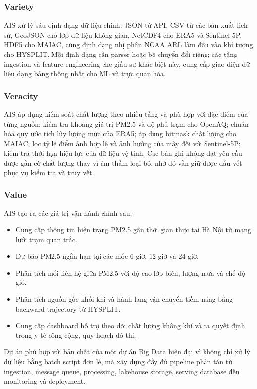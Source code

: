 \documentclass[12pt,a4paper]{article}
\newcommand{\tightlist}{\setlength{\itemsep}{0pt}\setlength{\parskip}{0pt}}
\begin{document}
\subsubsection{Variety}

AIS xử lý sáu định dạng dữ liệu chính: JSON từ API, CSV từ các bản xuất lịch sử, GeoJSON cho lớp dữ liệu không gian, NetCDF4 cho ERA5 và Sentinel-5P, HDF5 cho MAIAC, cùng định dạng nhị phân NOAA ARL làm đầu vào khí tượng cho HYSPLIT. Mỗi định dạng cần parser hoặc bộ chuyển đổi riêng; các tầng ingestion và feature engineering che giấu sự khác biệt này, cung cấp giao diện dữ liệu dạng bảng thống nhất cho ML và trực quan hóa.

\subsubsection{Veracity}

AIS áp dụng kiểm soát chất lượng theo nhiều tầng và phù hợp với đặc điểm của từng nguồn: kiểm tra khoảng giá trị PM2.5 và độ phủ trạm cho OpenAQ; chuẩn hóa quy ước tích lũy lượng mưa của ERA5; áp dụng bitmask chất lượng cho MAIAC; lọc tỷ lệ điểm ảnh hợp lệ và ảnh hưởng của mây đối với Sentinel-5P; kiểm tra thời hạn hiệu lực của dữ liệu vệ tinh. Các bản ghi không đạt yêu cầu được gắn cờ chất lượng thay vì âm thầm loại bỏ, nhờ đó vẫn giữ được dấu vết phục vụ kiểm tra và truy vết.

\subsubsection{Value}

AIS tạo ra các giá trị vận hành chính sau:

\begin{itemize}
\tightlist
\item
  Cung cấp thông tin hiện trạng PM2.5 gần thời gian thực tại Hà Nội từ mạng lưới trạm quan trắc.
\item
  Dự báo PM2.5 ngắn hạn tại các mốc 6 giờ, 12 giờ và 24 giờ.
\item
  Phân tích mối liên hệ giữa PM2.5 với độ cao lớp biên, lượng mưa và chế độ gió.
\item
  Phân tích nguồn gốc khối khí và hành lang vận chuyển tiềm năng bằng backward trajectory từ HYSPLIT.
\item
  Cung cấp dashboard hỗ trợ theo dõi chất lượng không khí và ra quyết định trong y tế công cộng, quy hoạch đô thị.
\end{itemize}

Dự án phù hợp với bản chất của một dự án Big Data hiện đại vì không chỉ xử lý dữ liệu bằng batch script đơn lẻ, mà xây dựng đầy đủ pipeline phân tán từ ingestion, message queue, processing, lakehouse storage, serving database đến monitoring và deployment.
\end{document}
